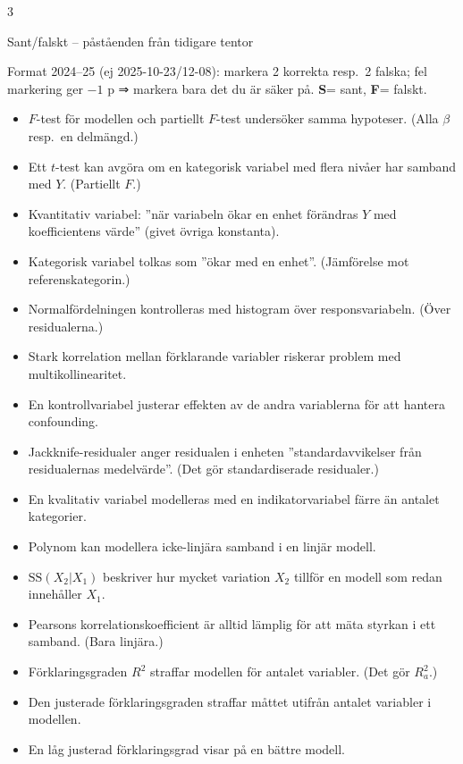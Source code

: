 \documentclass[8pt]{extarticle}
\makeatletter
\newcounter{sect}
\newcommand{\sect}[3][hd]{\par\vspace{1.5pt}\refstepcounter{sect}\noindent
  {\setlength{\fboxsep}{1.8pt}\colorbox{#1}{\parbox{\dimexpr\linewidth-2\fboxsep}{\color{white}\sffamily\bfseries
  \strut\thesect\enspace #2}}}\label{#3}\par\nobreak\vspace{0.8pt}\@afterheading}
\newcommand{\sant}{\textcolor{OliveGreen}{\sffamily\bfseries S}}
\newcommand{\falskt}{\textcolor{BrickRed}{\sffamily\bfseries F}}
\newcommand{\SSq}{\mathrm{SS}}
\makeatother
\begin{document}
\begin{multicols*}{3}
\sect[cTenta]{Sant/falskt – påståenden från tidigare tentor}{sec:sf}
{\footnotesize Format 2024–25 (ej 2025-10-23/12-08): markera 2 korrekta resp.\ 2 falska; fel markering ger $-1$ p ⇒ markera bara det du är säker på. \sant = sant, \falskt = falskt.}
{\small\begin{itemize}[leftmargin=7pt,labelsep=2pt]
\item[\falskt] $F$-test för modellen och partiellt $F$-test undersöker samma hypoteser. (Alla $\beta$ resp.\ en delmängd.)
\item[\falskt] Ett $t$-test kan avgöra om en kategorisk variabel med flera nivåer har samband med $Y$. (Partiellt $F$.)
\item[\sant] Kvantitativ variabel: ”när variabeln ökar en enhet förändras $Y$ med koefficientens värde” (givet övriga konstanta).
\item[\falskt] Kategorisk variabel tolkas som ”ökar med en enhet”. (Jämförelse mot referenskategorin.)
\item[\falskt] Normalfördelningen kontrolleras med histogram över responsvariabeln. (Över residualerna.)
\item[\sant] Stark korrelation mellan förklarande variabler riskerar problem med multikollinearitet.
\item[\sant] En kontrollvariabel justerar effekten av de andra variablerna för att hantera confounding.
\item[\falskt] Jackknife-residualer anger residualen i enheten ”standardavvikelser från residualernas medelvärde”. (Det gör standardiserade residualer.)
\item[\sant] En kvalitativ variabel modelleras med en indikatorvariabel färre än antalet kategorier.
\item[\sant] Polynom kan modellera icke-linjära samband i en linjär modell.
\item[\sant] $\SSq(X_2|X_1)$ beskriver hur mycket variation $X_2$ tillför en modell som redan innehåller $X_1$.
\item[\falskt] Pearsons korrelationskoefficient är alltid lämplig för att mäta styrkan i ett samband. (Bara linjära.)
\item[\falskt] Förklaringsgraden $R^2$ straffar modellen för antalet variabler. (Det gör $R^2_a$.)
\item[\sant] Den justerade förklaringsgraden straffar måttet utifrån antalet variabler i modellen.
\item[\falskt] En låg justerad förklaringsgrad visar på en bättre modell.

\end{itemize}}
\end{multicols*}
\end{document}
